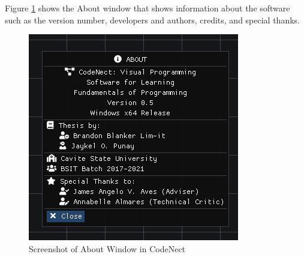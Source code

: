 \parx
Figure \ref{fig:cn_about} shows the About window that shows information about the
software such as the version number, developers and authors, credits, and special thanks.

\begin{figure}[H]
	\centering
	\captionsetup{justification=centering}
	\captionsetup[figure]{list=yes}
	\includegraphics[width=\linewidth]{media/sc_about.png}
	\caption[Screenshot of About Window in CodeNect]{Screenshot of About Window in CodeNect}
	\label{fig:cn_about}
\end{figure}
